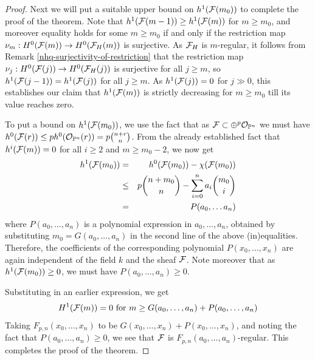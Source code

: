 \begin{proof}
Next we will put a suitable upper bound on $h^1(\mathcal{F}(m_0))$ to complete the
proof of the theorem. Note that
$h^1(\mathcal{F}(m-1))\ge h^1(\mathcal{F}(m))$ for $m\ge m_0$,
and moreover equality holds for some $m\ge m_0$
if and only if the restriction map
$\nu_m : H^0(\mathcal{F}(m)) \to H^0(\mathcal{F}_H(m))$ is surjective.
As $\mathcal{F}_H$ is $m$-regular, it follows from
Remark \ref{nhq-surjectivity-of-restriction} that the restriction map
$\nu_j : H^0(\mathcal{F}(j)) \to H^0(\mathcal{F}_H(j))$ is surjective for all
$j\ge m$, so $h^1(\mathcal{F}(j-1)) = h^1(\mathcal{F}(j))$ for all $j\ge m$.
As $h^1(\mathcal{F}(j))=0$ for $j\gg 0$, this establishes our claim that
$h^1(\mathcal{F}(m))$ is strictly decreasing for
$m\ge m_0$ till its value reaches zero.


To put a bound on $h^1(\mathcal{F}(m_0))$, we use the fact that
as $\mathcal{F} \subset \oplus^p{\mathcal O}_{\mathbb{P}^n}$ we must have
$h^0(\mathcal{F}(r)) \le p h^0({\mathcal O}_{\mathbb{P}^n}(r)) = p{n + r\choose  n}$.
From the already established fact that
$h^i(\mathcal{F}(m)) = 0$ for all $i\ge 2$ and $m\ge m_0-2$, we now get
\begin{eqnarray*}
h^1(\mathcal{F}(m_0))&=& h^0(\mathcal{F}(m_0)) - \chi(\mathcal{F}(m_0)) \\
            &\le&p{n + m_0\choose  n}-\sum_{i=0}^n a_i {m_0\choose i}\\
            &=& P(a_0,\ldots a_n)
\end{eqnarray*}
where $P(a_0,\ldots, a_n)$ is a polynomial expression in
$a_0,\ldots, a_n$, obtained by substituting
$m_0 = G(a_0,\ldots, a_n)$ in the second line of the above (in)equalities.
Therefore, the coefficients of the corresponding polynomial
$P(x_0,\ldots, x_n)$ are again independent of the field $k$
and the sheaf $\mathcal{F}$. Note moreover that as
$h^1(\mathcal{F}(m_0))\ge 0$, we must have $P(a_0,\ldots, a_n) \ge 0$.


Substituting in an earlier expression, we get
$$H^1(\mathcal{F}(m))=0 \mbox{ for }  m \ge G(a_0,\ldots, a_n) + P(a_0,\ldots, a_n)$$
Taking $F_{p,n}(x_0,\ldots, x_n)$ to be $G(x_0,\ldots, x_n) +
P(x_0,\ldots, x_n)$, and noting the fact that
$P(a_0,\ldots, a_n) \ge 0$, we see that
$\mathcal{F}$ is $F_{p,n}(a_0,\ldots, a_n)$-regular.
This completes the proof of the theorem. \end{proof}

\medskip
